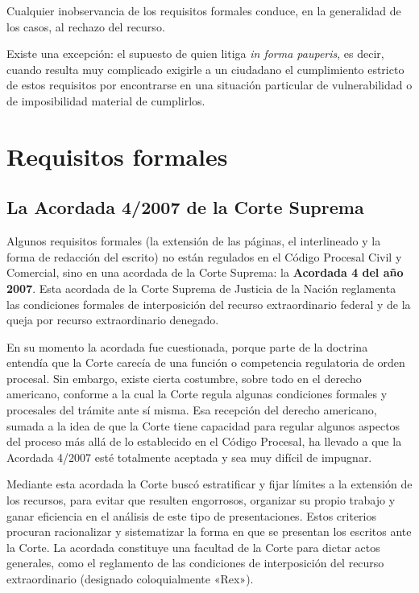\documentclass[12pt,oneside]{book}
\begin{document}
\begin{important}
Cualquier inobservancia de los requisitos formales conduce, en la generalidad de los casos, al rechazo del recurso.

Existe una excepción: el supuesto de quien litiga \textit{in forma pauperis}, es decir, cuando resulta muy complicado exigirle a un ciudadano el cumplimiento estricto de estos requisitos por encontrarse en una situación particular de vulnerabilidad o de imposibilidad material de cumplirlos.
\end{important}

\section{Requisitos formales}

\subsection{La Acordada 4/2007 de la Corte Suprema}

Algunos requisitos formales (la extensión de las páginas, el interlineado y la forma de redacción del escrito) no están regulados en el Código Procesal Civil y Comercial, sino en una acordada de la Corte Suprema: la \textbf{Acordada 4 del año 2007}. Esta acordada de la Corte Suprema de Justicia de la Nación reglamenta las condiciones formales de interposición del recurso extraordinario federal y de la queja por recurso extraordinario denegado.

En su momento la acordada fue cuestionada, porque parte de la doctrina entendía que la Corte carecía de una función o competencia regulatoria de orden procesal. Sin embargo, existe cierta costumbre, sobre todo en el derecho americano, conforme a la cual la Corte regula algunas condiciones formales y procesales del trámite ante sí misma. Esa recepción del derecho americano, sumada a la idea de que la Corte tiene capacidad para regular algunos aspectos del proceso más allá de lo establecido en el Código Procesal, ha llevado a que la Acordada 4/2007 esté totalmente aceptada y sea muy difícil de impugnar.

Mediante esta acordada la Corte buscó estratificar y fijar límites a la extensión de los recursos, para evitar que resulten engorrosos, organizar su propio trabajo y ganar eficiencia en el análisis de este tipo de presentaciones. Estos criterios procuran racionalizar y sistematizar la forma en que se presentan los escritos ante la Corte. La acordada constituye una facultad de la Corte para dictar actos generales, como el reglamento de las condiciones de interposición del recurso extraordinario (designado coloquialmente «Rex»).
\end{document}
